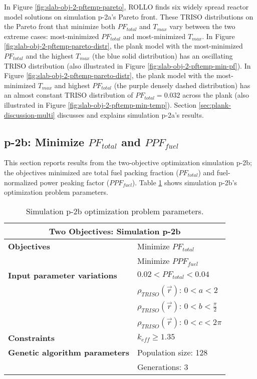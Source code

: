 In Figure \ref{fig:slab-obj-2-pftemp-pareto}, \gls{ROLLO} finds six widely spread 
reactor model solutions on simulation p-2a's Pareto front. 
These \gls{TRISO} distributions on the Pareto front that minimize both $PF_{total}$ and 
$T_{max}$ vary between the two extreme cases: 
most-minimized $PF_{total}$ and most-minimized $T_{max}$. 
In Figure \ref{fig:slab-obj-2-pftemp-pareto-distr}, the plank model with the
most-minimized $PF_{total}$ and the highest $T_{max}$ (the blue solid distribution) 
has an oscillating TRISO distribution (also illustrated in Figure 
\ref{fig:slab-obj-2-pftemp-min-pf}).
In Figure \ref{fig:slab-obj-2-pftemp-pareto-distr}, the plank model with the 
most-minimized $T_{max}$ and highest $PF_{total}$ (the purple densely dashed distribution)
has an almost constant TRISO distribution of $PF_{total}=0.032$ across the plank (also 
illustrated in Figure \ref{fig:slab-obj-2-pftemp-min-temp}). 
Section \ref{sec:plank-discussion-multi} discusses and explains simulation p-2a's results.

\subsection{p-2b: Minimize $PF_{total}$ and $PPF_{fuel}$}
\label{sec:p-2b}
This section reports results from the two-objective optimization simulation p-2b; the 
objectives minimized are total fuel packing fraction ($PF_{total}$) and fuel-normalized 
power peaking factor ($PPF_{fuel}$).  
Table \ref{tab:simulationp2b} shows simulation p-2b's optimization problem parameters. 
\begin{table}[htbp!]
    \centering
    \onehalfspacing
    \caption{Simulation p-2b optimization problem parameters.}
	\label{tab:simulationp2b}
    \footnotesize
    \begin{tabular}{l|p{4cm}}
    \hline 
    \multicolumn{2}{c}{\textbf{Two Objectives: Simulation p-2b}} \\
    \hline 
    \textbf{Objectives} & Minimize $PF_{total}$ \\
    & Minimize $PPF_{fuel}$ \\
    \hline 
    \textbf{Input parameter variations} & $0.02<PF_{total}<0.04$ \\
    & $\rho_{TRISO}(\vec{r})$: $0<a<2$ \\
    & $\rho_{TRISO}(\vec{r})$: $0<b<\frac{\pi}{2}$ \\
    & $\rho_{TRISO}(\vec{r})$: $0<c<2\pi$ \\
    \hline
    \textbf{Constraints} & $k_{eff} \geq 1.35$\\ 
    \hline 
    \textbf{Genetic algorithm parameters} & Population size: 128 \\
    & Generations: 3 \\
    \hline
    \end{tabular}
\end{table}

